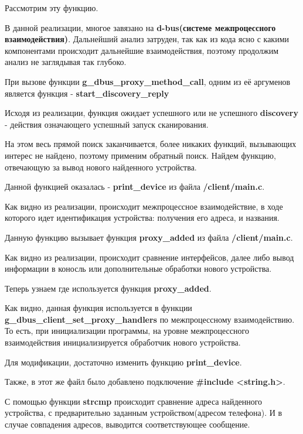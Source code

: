Рассмотрим эту функцию.

В данной реализации, многое завязано на \textbf{d-bus(системе межпроцессного взаимодействия)}. Дальнейший анализ затруден, так как из кода ясно с какими компонентами происходит дальнейшие взаимодействия, поэтому продолжим анализ не заглядывая так глубоко.

При вызове функции \textbf{g\_dbus\_proxy\_method\_call}, одним из её аргуменов является функция - \textbf{start\_discovery\_reply}

Исходя из реализации, функция ожидает успешного или не успешного \textbf{discovery} - действия означающего успешный запуск сканирования.

На этом весь прямой поиск заканчивается, более никаких функций, вызывающих интерес не найдено, поэтому применим обратный поиск. Найдем функцию, отвечающую за вывод нового найденного устройства.

Данной функцией оказалась - \textbf{print\_device} из файла \textbf{/client/main.c}.

Как видно из реализации, происходит межпроцессное взаимодействие, в ходе которого идет идентификация устройства: получения его адреса, и названия.

Данную функцию вызывает функция \textbf{proxy\_added} из файла \textbf{/client/main.c}.


Как видно из реализации, происходит сравнение интерфейсов, далее либо вывод информации в коносль или дополнительные обработки нового устройства.

Теперь узнаем где используется функция \textbf{proxy\_added}.

Как видно, данная функция используется в функции \textbf{g\_dbus\_client\_set\_proxy\_handlers} по межпроцессному взаимодействию. То есть, при инициализации программы, на уровне межпроцессного взаимодействия инициализируется обработчик нового устройства.

Для модификации, достаточно изменить функцию \textbf{print\_device}.

Также, в этот же файл было добавлено подключение \textbf{\#include <string.h>}.

С помощью функции \textbf{strcmp} происходит сравнение адреса найденного устройства, с предварительно заданным устройством(адресом телефона). И в случае совпадения адресов, выводится соответствующее сообщение.

